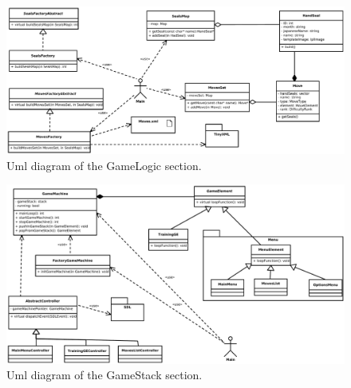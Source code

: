 \documentclass[a4paper,10pt, twocolumn]{article}
\begin{document}
\begin{figure}[tp]
    \centering    
    \caption{Uml diagram of the GameLogic section.}
    \label{gameLogicDiagram}       
    \includegraphics[scale=0.45]{UmlDiagrams/gameLogic.pdf}
  \end{figure}
  
  \begin{figure}[bp]
    \centering    
    \caption{Uml diagram of the GameStack section.}
    \label{gameStackDiagram}       
    \includegraphics[scale=0.4]{UmlDiagrams/gameStack.pdf}
  \end{figure}
\end{document}
